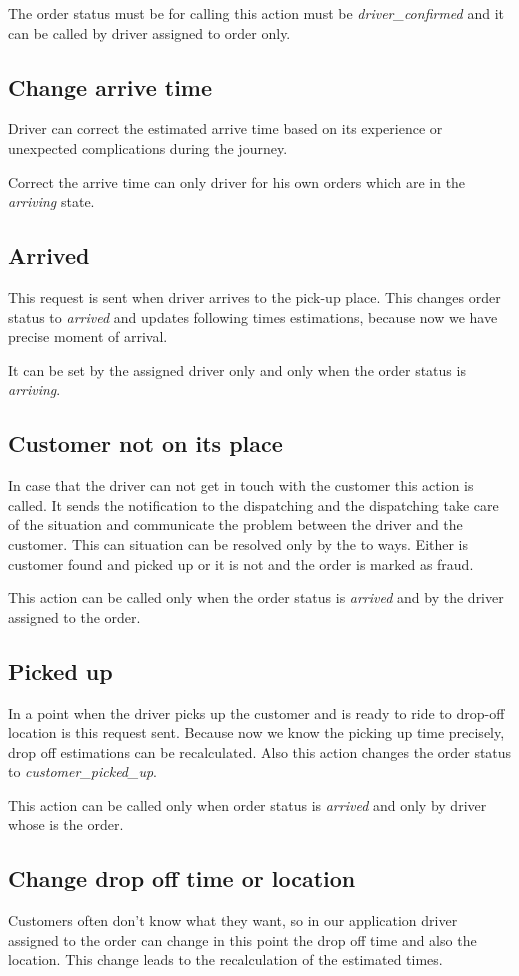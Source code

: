 			The order status must be for calling this action must be \textit{driver\_confirmed} and it can be called by driver assigned to order only. 
		\subsection{Change arrive time}
			Driver can correct the estimated arrive time based on its experience or unexpected complications during the journey.
			
			Correct the arrive time can only driver for his own orders which are in the \textit{arriving} state.
		\subsection{Arrived}
			This request is sent when driver arrives to the pick-up place. This changes order status to \textit{arrived} and updates following times estimations, because now we have precise moment of arrival.
			
			It can be set by the assigned driver only and only when the order status is \textit{arriving}.
		\subsection{Customer not on its place}
		In case that the driver can not get in touch with the customer this action is called. It sends the notification to the dispatching and the dispatching take care of the situation and communicate the problem between the driver and the customer. This can situation can be resolved only by the to ways. Either is customer found and picked up or it is not and the order is marked as fraud. 
		
		This action can be called only when the order status is \textit{arrived} and by the driver assigned to the order.
		\subsection{Picked up}
		In a point when the driver picks up the customer and is ready to ride to drop-off location is this request sent. Because now we know the picking up time precisely, drop off estimations can be recalculated. Also this action changes the order status to \textit{customer\_picked\_up}.
		
		This action can be called only when order status is \textit{arrived} and only by driver whose is the order.
		\subsection{Change drop off time or location}
			Customers often don't know what they want, so in our application driver assigned to the order can change in this point the drop off time and also the location. This change leads to the recalculation of the estimated times. 
